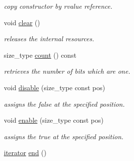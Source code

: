 \begin{DoxyCompactItemize}
\begin{DoxyCompactList}\small\item\em copy constructor by rvalue reference. \end{DoxyCompactList}\item 
\hypertarget{classhryky_1_1_bitset_ae23f0938de9aeb3cae80fbc5ad4ffbe4}{void \hyperlink{classhryky_1_1_bitset_ae23f0938de9aeb3cae80fbc5ad4ffbe4}{clear} ()}\label{classhryky_1_1_bitset_ae23f0938de9aeb3cae80fbc5ad4ffbe4}

\begin{DoxyCompactList}\small\item\em releases the internal resources. \end{DoxyCompactList}\item 
\hypertarget{classhryky_1_1_bitset_a20d189bc95da6a2aef278b8ab953d667}{size\-\_\-type \hyperlink{classhryky_1_1_bitset_a20d189bc95da6a2aef278b8ab953d667}{count} () const }\label{classhryky_1_1_bitset_a20d189bc95da6a2aef278b8ab953d667}

\begin{DoxyCompactList}\small\item\em retrieves the number of bits which are one. \end{DoxyCompactList}\item 
\hypertarget{classhryky_1_1_bitset_ae4da085a5c1780906a9df5252b86624b}{void \hyperlink{classhryky_1_1_bitset_ae4da085a5c1780906a9df5252b86624b}{disable} (size\-\_\-type const pos)}\label{classhryky_1_1_bitset_ae4da085a5c1780906a9df5252b86624b}

\begin{DoxyCompactList}\small\item\em assigns the false at the specified position. \end{DoxyCompactList}\item 
\hypertarget{classhryky_1_1_bitset_a1db71e8b84836648e8e4261c20a9a1bc}{void \hyperlink{classhryky_1_1_bitset_a1db71e8b84836648e8e4261c20a9a1bc}{enable} (size\-\_\-type const pos)}\label{classhryky_1_1_bitset_a1db71e8b84836648e8e4261c20a9a1bc}

\begin{DoxyCompactList}\small\item\em assigns the true at the specified position. \end{DoxyCompactList}\item 
\hypertarget{classhryky_1_1_bitset_a1b66eeafa0a16b7bd4b7914421b59c60}{\hyperlink{classhryky_1_1iterator_1_1random_1_1_mutable}{iterator} \hyperlink{classhryky_1_1_bitset_a1b66eeafa0a16b7bd4b7914421b59c60}{end} ()}\label{classhryky_1_1_bitset_a1b66eeafa0a16b7bd4b7914421b59c60}


\end{DoxyCompactItemize}
